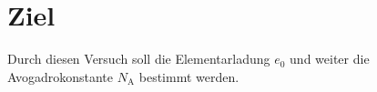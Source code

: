 \section{Ziel}
\label{sec:Ziel}
Durch diesen Versuch soll die Elementarladung $e_0$ und weiter die Avogadrokonstante $N_{\text{A}}$ bestimmt werden.
